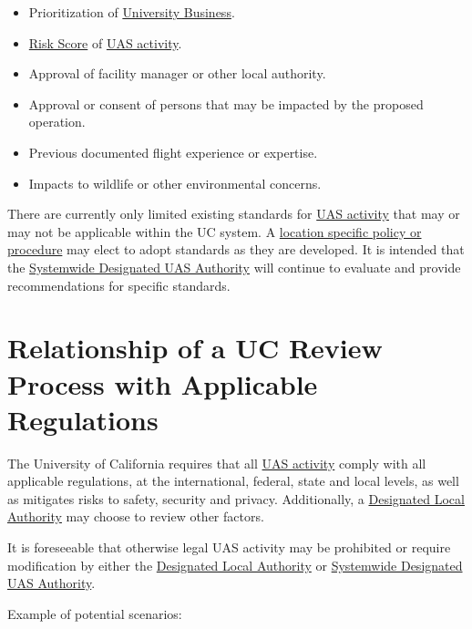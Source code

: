 \documentclass[
]{book}
\providecommand{\tightlist}{%
  \setlength{\itemsep}{0pt}\setlength{\parskip}{0pt}}
\begin{document}
\begin{itemize}
\tightlist
\item
  Prioritization of \protect\hyperlink{UB}{University Business}.
\item
  \protect\hyperlink{riskscore}{Risk Score} of \protect\hyperlink{UASactivity}{UAS activity}.
\item
  Approval of facility manager or other local authority.
\item
  Approval or consent of persons that may be impacted by the proposed operation.
\item
  Previous documented flight experience or expertise.
\item
  Impacts to wildlife or other environmental concerns.
\end{itemize}

There are currently only limited existing standards for \protect\hyperlink{UASactivity}{UAS activity} that may or may not be applicable within the UC system. A \protect\hyperlink{LSP}{location specific policy or procedure} may elect to adopt standards as they are developed. It is intended that the \protect\hyperlink{SDA}{Systemwide Designated UAS Authority} will continue to evaluate and provide recommendations for specific standards.

\hypertarget{s-rp}{%
\section{Relationship of a UC Review Process with Applicable Regulations}\label{s-rp}}

The University of California requires that all \protect\hyperlink{UASactivity}{UAS activity} comply with all applicable regulations, at the international, federal, state and local levels, as well as mitigates risks to safety, security and privacy. Additionally, a \protect\hyperlink{DLA}{Designated Local Authority} may choose to review other factors.

It is foreseeable that otherwise legal UAS activity may be prohibited or require modification by either the \protect\hyperlink{DLA}{Designated Local Authority} or \protect\hyperlink{SDA}{Systemwide Designated UAS Authority}.

Example of potential scenarios:
\end{document}
